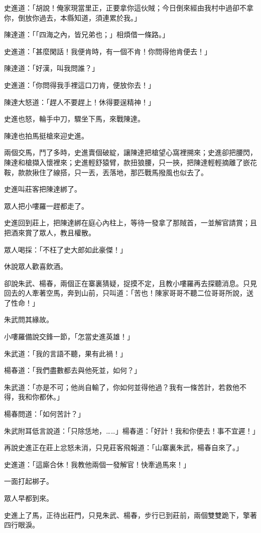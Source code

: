 \documentclass[11pt,a4paper]{article}
\begin{document}
史進道：「胡說！俺家現當里正，正要拿你這伙賊；今日倒來經由我村中過卻不拿你，倒放你過去，本縣知道，須連累於我。」

陳達道：「「四海之內，皆兄弟也；」相煩借一條路。」

史進道：「甚麼閑話！我便肯時，有一個不肯！你問得他肯便去！」

陳達道：「好漢，叫我問誰？」

史進道：「你問得我手裡這口刀肯，便放你去！」

陳達大怒道：「趕人不要趕上！休得要逞精神！」

史進也怒，輪手中刀，驟坐下馬，來戰陳達。

陳達也拍馬挺槍來迎史進。

兩個交馬，鬥了多時，史進賣個破綻，讓陳達把槍望心窩裡搠來；史進卻把腰閃，陳達和槍擷入懷裡來；史進輕舒猿臂，款扭狼腰，只一挾，把陳達輕輕摘離了嵌花鞍，款款揪住了線搭，只一丟，丟落地，那匹戰馬撥風也似去了。

史進叫莊客把陳達綁了。

眾人把小嘍羅一趕都走了。

史進回到莊上，把陳達綁在庭心內柱上，等待一發拿了那賊首，一並解官請賞；且把酒來賞了眾人，教且權散。

眾人喝採：「不枉了史大郎如此豪傑！」

休說眾人歡喜飲酒。

卻說朱武、楊春，兩個正在寨裏猜疑，捉摸不定，且教小嘍羅再去探聽消息。只見回去的人牽著空馬，奔到山前，只叫道：「苦也！陳家哥哥不聽二位哥哥所說，送了性命！」

朱武問其緣故。

小嘍羅備說交鋒一節，「怎當史進英雄！」

朱武道：「我的言語不聽，果有此禍！」

楊春道：「我們盡數都去與他死並，如何？」

朱武道：「亦是不可；他尚自輸了，你如何並得他過？我有一條苦計，若救他不得，我和你都休。」

楊春問道：「如何苦計？」

朱武附耳低言說道：「只除恁地，……」楊春道：「好計！我和你便去！事不宜遲！」

再說史進正在莊上忿怒未消，只見莊客飛報道：「山寨裏朱武，楊春自來了。」

史進道：「這廝合休！我教他兩個一發解官！快牽過馬來！」

一面打起梆子。

眾人早都到來。

史進上了馬，正待出莊門，只見朱武、楊春，步行已到莊前，兩個雙雙跪下，擎著四行眼淚。
\end{document}

